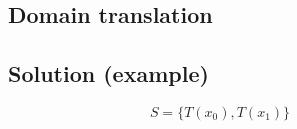 \documentclass[portrait]{sciposter}
\begin{document}
\begin{figure}[ht]
\begin{minipage}{0.333\linewidth}
\subsection*{Domain translation}
\subsection*{Solution (example)}
\[ S = \{T(x_0), T(x_1)\} \]
\end{minipage}
\end{figure}


\end{document}
